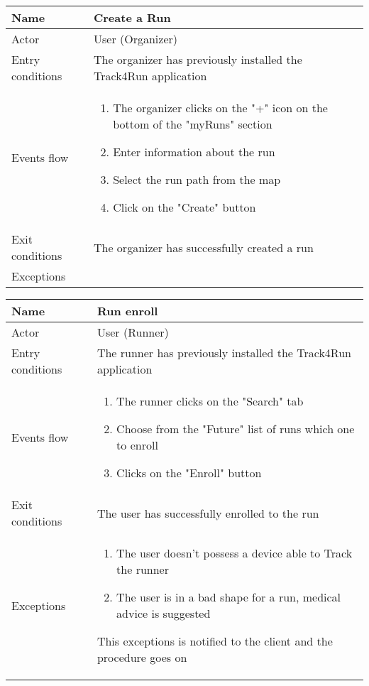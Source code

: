 \begin{table}[h!]
\begin{tabular}{|l|p{12cm}|}
\hline
Name             & Create a Run \\ \hline
Actor            & User (Organizer) \\ \hline
Entry conditions & The organizer has previously installed the Track4Run application \\ \hline
Events flow      & \begin{enumerate}
\item The organizer clicks on the "+" icon on the bottom of the "myRuns" section
\item Enter information about the run
\item Select the run path from the map
\item Click on the "Create" button
\end{enumerate} \\ \hline
Exit conditions  & The organizer has successfully created a run \\ \hline
Exceptions       & \\ \hline
\end{tabular}
\end{table}

\begin{table}[]
\begin{tabular}{|l|p{12cm}|}
\hline
Name             & Run enroll \\ \hline
Actor            & User (Runner)\\ \hline
Entry conditions & The runner has previously installed the Track4Run application \\ \hline
Events flow      & \begin{enumerate}
\item The runner clicks on the "Search" tab 
\item Choose from the "Future" list of runs which one to enroll
\item Clicks on the "Enroll" button
\end{enumerate} \\ \hline
Exit conditions  & The user has successfully enrolled to the run \\ \hline
Exceptions       & \begin{enumerate}
\item The user doesn't possess a device able to Track the runner
\item The user is in a bad shape for a run, medical advice is suggested
\end{enumerate} This exceptions is notified to the client and the procedure goes on\\ \hline
\end{tabular}
\end{table}

